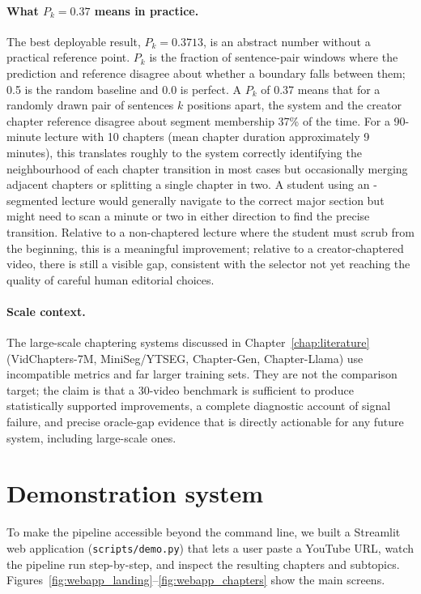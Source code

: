\paragraph{What $P_k = 0.37$ means in practice.}
The best deployable result, $P_k=0.3713$, is an abstract number without a
practical reference point.
$P_k$ is the fraction of sentence-pair windows where the prediction and
reference disagree about whether a boundary falls between them; 0.5 is the
random baseline and 0.0 is perfect.
A $P_k$ of 0.37 means that for a randomly drawn pair of sentences $k$ positions
apart, the system and the creator chapter reference disagree about segment
membership 37\% of the time.
For a 90-minute lecture with 10 chapters (mean chapter duration approximately
9 minutes), this translates roughly to the system correctly identifying the
neighbourhood of each chapter transition in most cases but occasionally merging
adjacent chapters or splitting a single chapter in two.
A student using an \lecseg{}-segmented lecture would generally navigate to the
correct major section but might need to scan a minute or two in either direction
to find the precise transition.
Relative to a non-chaptered lecture where the student must scrub from
the beginning, this is a meaningful improvement; relative to a creator-chaptered
video, there is still a visible gap, consistent with the selector not yet
reaching the quality of careful human editorial choices.

\paragraph{Scale context.}
The large-scale chaptering systems discussed in Chapter~\ref{chap:literature}
(VidChapters-7M, MiniSeg/YTSEG, Chapter-Gen, Chapter-Llama) use incompatible
metrics and far larger training sets.
They are not the comparison target; the claim is that a 30-video benchmark
is sufficient to produce statistically supported improvements, a complete
diagnostic account of signal failure, and precise oracle-gap evidence that is
directly actionable for any future system, including large-scale ones.

\section{Demonstration system}
\label{sec:demo_system}

To make the pipeline accessible beyond the command line, we built a Streamlit
web application (\texttt{scripts/demo.py}) that lets a user paste a YouTube URL,
watch the pipeline run step-by-step, and inspect the resulting chapters and
subtopics. Figures~\ref{fig:webapp_landing}--\ref{fig:webapp_chapters} show
the main screens.

